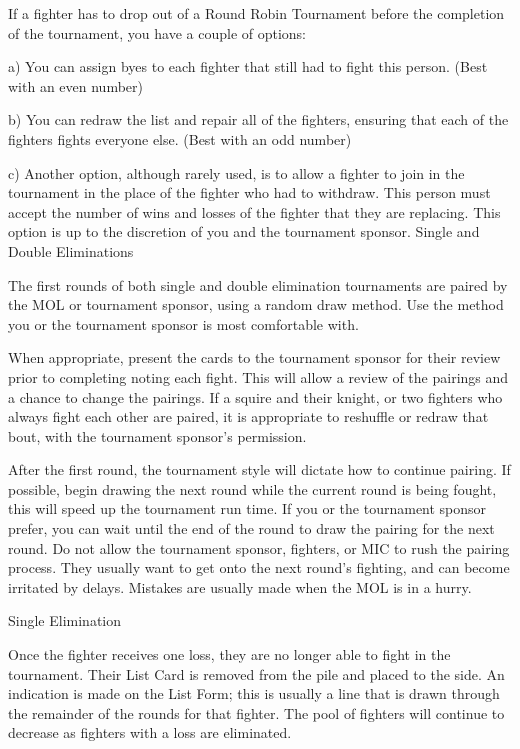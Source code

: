 \documentclass{article}
\begin{document}
If a fighter has to drop out of a Round Robin Tournament before the completion of the tournament, you
have a couple of options:

a) You can assign byes to each fighter that still had to fight this person. (Best with an even number)

b) You can redraw the list and repair all of the fighters, ensuring that each of the fighters fights everyone
else. (Best with an odd number)

c) Another option, although rarely used, is to allow a fighter to join in the tournament in the place of the
fighter who had to withdraw. This person must accept the number of wins and losses of the fighter that
they are replacing. This option is up to the discretion of you and the tournament sponsor.
Single and Double Eliminations

The first rounds of both single and double elimination tournaments are paired by the MOL or tournament
sponsor, using a random draw method. Use the method you or the tournament sponsor is most
comfortable with.

When appropriate, present the cards to the tournament sponsor for their review prior to completing noting
each fight. This will allow a review of the pairings and a chance to change the pairings. If a squire and
their knight, or two fighters who always fight each other are paired, it is appropriate to reshuffle or redraw
that bout, with the tournament sponsor’s permission.

After the first round, the tournament style will dictate how to continue pairing. If possible, begin drawing
the next round while the current round is being fought, this will speed up the tournament run time. If you
or the tournament sponsor prefer, you can wait until the end of the round to draw the pairing for the next
round. Do not allow the tournament sponsor, fighters, or MIC to rush the pairing process. They usually
want to get onto the next round’s fighting, and can become irritated by delays. Mistakes are usually made
when the MOL is in a hurry.


Single Elimination

Once the fighter receives one loss, they are no longer able to fight in the tournament. Their List Card is
removed from the pile and placed to the side. An indication is made on the List Form; this is usually a line
that is drawn through the remainder of the rounds for that fighter. The pool of fighters will continue to
decrease as fighters with a loss are eliminated.
\end{document}
